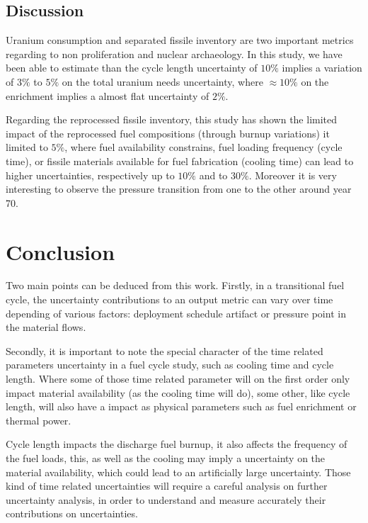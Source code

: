 \documentclass{anstrans}
\begin{document}
\subsection{Discussion}

Uranium consumption and separated fissile inventory are two important metrics
regarding to non proliferation and nuclear archaeology. In this study, we have
been able to estimate than the cycle length uncertainty of $10\%$ implies a
variation of $3\%$ to $5\%$ on the total uranium needs uncertainty, where $\approx10\%$
on the enrichment implies a almost flat uncertainty of $2\%$.

Regarding the reprocessed fissile inventory, this study has shown the limited
impact of the reprocessed fuel compositions (through burnup variations) it
limited to $5\%$, where fuel availability constrains, fuel loading frequency (cycle
time), or fissile materials available for fuel fabrication (cooling time) can lead to higher
uncertainties, respectively up to $10\%$ and to $30\%$. Moreover it is very
interesting to observe the pressure transition from one to the other around
year 70.


\section{Conclusion}

Two main points can be deduced from this work.  Firstly, in a transitional
fuel cycle, the uncertainty contributions to an output metric can vary over time
depending of various factors: deployment schedule artifact or pressure point in
the material flows.

Secondly, it is important to note the special character of the time related
parameters uncertainty in a fuel cycle study, such as cooling time and cycle
length. Where some of those time related parameter will on the first order only
impact material availability (as the cooling time will do), some other, like
cycle length, will also have a impact as physical parameters such as fuel
enrichment or thermal power. 

Cycle length impacts the discharge fuel burnup, it also affects the frequency of
the fuel loads, this, as well as the cooling may imply a uncertainty on the
material availability, which could lead to an artificially large uncertainty.
Those kind of time related uncertainties will require a careful analysis on further
uncertainty analysis, in order to understand and measure accurately their
contributions on uncertainties.
\end{document}
